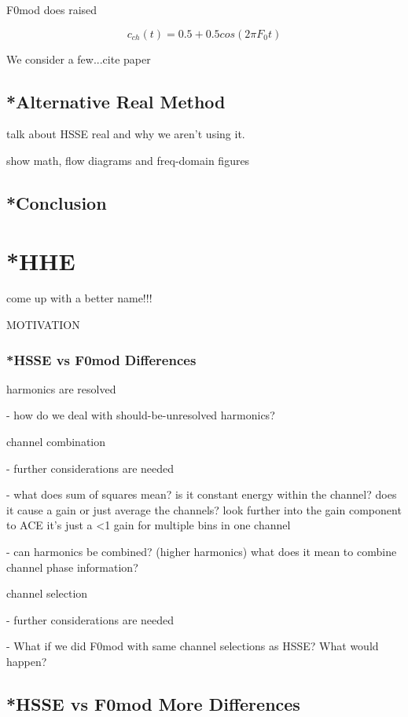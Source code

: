 \documentclass [11pt, proquest] {uwthesis}[2015/03/03]
\begin{document}
F0mod does raised

$$c_{ch}(t) = 0.5 + 0.5cos(2\pi F_0t)$$


We consider a few...cite paper

\section{*Alternative Real Method}

talk about HSSE real{} and why we aren't using it.

show math, flow diagrams and freq-domain figures

\section{*Conclusion}



\chapter{*HHE}
come up with a better name!!!

MOTIVATION

\subsection{*HSSE vs F0mod Differences}

harmonics are resolved

 - how do we deal with should-be-unresolved harmonics?

channel combination

 - further considerations are needed

 - what does sum of squares mean? is it constant energy within the channel?  does it cause a gain or just average the channels?  look further into the gain component to ACE
 	it's just a <1 gain for multiple bins in one channel

 - can harmonics be combined? (higher harmonics) what does it mean to combine channel phase information?

channel selection

 - further considerations are needed

 - What if we did F0mod with same channel selections as HSSE?  What would happen?

\section{*HSSE vs F0mod More Differences}
\end{document}
